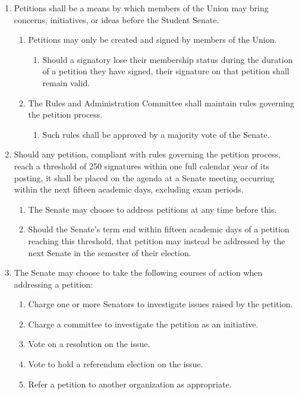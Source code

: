 \documentclass{uniondoc}
\begin{document}
\begin{enumerate}
	\item Petitions shall be a means by which members of the Union may bring concerns, initiatives, or ideas before the Student Senate.
	      \begin{enumerate}
		      \item Petitions may only be created and signed by members of the Union.
		            \begin{enumerate}
			            \item Should a signatory lose their membership status during the duration of a petition they have signed, their signature on that petition shall remain valid.
		            \end{enumerate}
		      \item The Rules and Administration Committee shall maintain rules governing the petition process.
		            \begin{enumerate}
			            \item Such rules shall be approved by a majority vote of the Senate.
		            \end{enumerate}
	      \end{enumerate}
	\item Should any petition, compliant with rules governing the petition process, reach a threshold of 250 signatures within one full calendar year of its posting, it shall be placed on the agenda at a Senate meeting occurring within the next fifteen academic days, excluding exam periods.
	      \begin{enumerate}
		      \item The Senate may choose to address petitions at any time before this.
		      \item Should the Senate’s term end within fifteen academic days of a petition reaching this threshold, that petition may instead be addressed by the next Senate in the semester of their election.
	      \end{enumerate}
	\item The Senate may choose to take the following courses of action when addressing a petition:
	      \begin{enumerate}
		      \item Charge one or more Senators to investigate issues raised by the petition.
		      \item Charge a committee to investigate the petition as an initiative.
		      \item Vote on a resolution on the issue.
		      \item Vote to hold a referendum election on the issue.
		      \item Refer a petition to another organization as appropriate.
	      \end{enumerate}
\end{enumerate}
\end{document}
